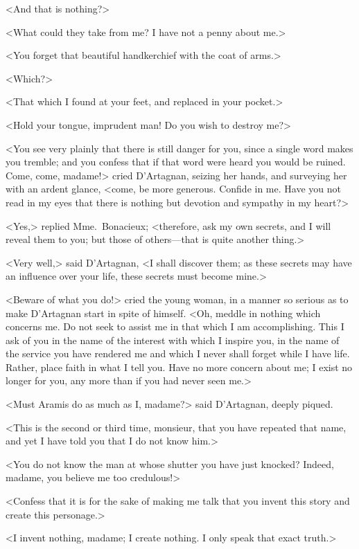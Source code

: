 <And that is nothing?> 

<What could they take from me? I have not a penny about me.> 

<You forget that beautiful handkerchief with the coat of arms.> 

<Which?> 

<That which I found at your feet, and replaced in your pocket.> 

<Hold your tongue, imprudent man! Do you wish to destroy me?> 

<You see very plainly that there is still danger for you, since a single word makes you tremble; and you confess that if that word were heard you would be ruined. Come, come, madame!> cried D'Artagnan, seizing her hands, and surveying her with an ardent glance, <come, be more generous. Confide in me. Have you not read in my eyes that there is nothing but devotion and sympathy in my heart?> 

<Yes,> replied Mme.~Bonacieux; <therefore, ask my own secrets, and I will reveal them to you; but those of others—that is quite another thing.> 

<Very well,> said D'Artagnan, <I shall discover them; as these secrets may have an influence over your life, these secrets must become mine.> 

<Beware of what you do!> cried the young woman, in a manner so serious as to make D'Artagnan start in spite of himself. <Oh, meddle in nothing which concerns me. Do not seek to assist me in that which I am accomplishing. This I ask of you in the name of the interest with which I inspire you, in the name of the service you have rendered me and which I never shall forget while I have life. Rather, place faith in what I tell you. Have no more concern about me; I exist no longer for you, any more than if you had never seen me.> 

<Must Aramis do as much as I, madame?> said D'Artagnan, deeply piqued. 

<This is the second or third time, monsieur, that you have repeated that name, and yet I have told you that I do not know him.> 

<You do not know the man at whose shutter you have just knocked? Indeed, madame, you believe me too credulous!> 

<Confess that it is for the sake of making me talk that you invent this story and create this personage.> 

<I invent nothing, madame; I create nothing. I only speak that exact truth.> 

